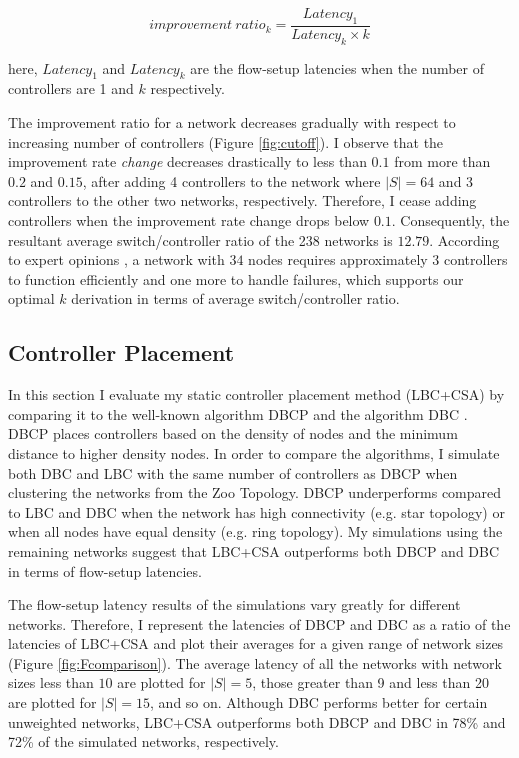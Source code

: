 \documentclass[preprint,12pt]{elsarticle}
\begin{document}
	\begin{equation}
	improvement~ratio_k = \frac{Latency_1}{Latency_k\times k}
	\end{equation}
	
	here, $Latency_1$ and $Latency_k$ are the flow-setup latencies when the number of controllers are 1 and $k$ respectively.
	
	The improvement ratio for a network decreases gradually with respect to increasing number of controllers (Figure \ref{fig:cutoff}). I observe that the improvement rate \textit{change} decreases drastically to less than $0.1$ from more than $0.2$ and $0.15$, after adding 4 controllers to the network where $|S|=64$ and 3 controllers to the other two networks, respectively. Therefore, I cease adding controllers when the improvement rate change drops below $0.1$. Consequently, the resultant average switch/controller ratio of the 238 networks is $12.79$. According to expert opinions \cite{cpp2012heller}, a network with $34$ nodes requires approximately $3$ controllers to function efficiently and one more to handle failures, which supports our optimal $k$ derivation in terms of average switch/controller ratio.
	
	\subsection{Controller Placement} \label{CPAnalysis}
	In this section I evaluate my static controller placement method (LBC+CSA) by comparing it to the well-known algorithm DBCP \cite{dbcp2017} and the algorithm DBC \cite{aziz2019degree}. DBCP places controllers based on the density of nodes and the minimum distance to higher density nodes. In order to compare the algorithms, I simulate both DBC and LBC with the same number of controllers as DBCP when clustering the networks from the Zoo Topology. DBCP underperforms compared to LBC and DBC when the network has high connectivity (e.g. star topology) or when all nodes have equal density (e.g. ring topology). My simulations using the remaining networks suggest that LBC+CSA outperforms both DBCP and DBC in terms of flow-setup latencies.
	
	The flow-setup latency results of the simulations vary greatly for different networks. Therefore, I represent the latencies of DBCP and DBC as a ratio of the latencies of LBC+CSA and plot their averages for a given range of network sizes (Figure \ref{fig:Fcomparison}). The average latency of all the networks with network sizes less than $10$ are plotted for $|S|=5$, those greater than 9 and less than 20 are plotted for $|S|=15$, and so on. Although DBC performs better for certain unweighted networks, LBC+CSA outperforms both DBCP and DBC in 78\% and 72\% of the simulated networks, respectively.
	
\end{document}

